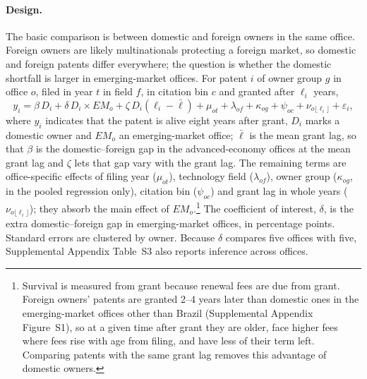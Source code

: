 \paragraph{Design.} The basic comparison is between domestic and foreign owners in the same office. Foreign owners are likely multinationals protecting a foreign market, so domestic
and foreign patents differ everywhere; the question is whether the domestic shortfall is larger in emerging-market
offices. For patent $i$ of owner group $g$ in office $o$, filed in year $t$ in field $f$, in citation bin $c$ and granted
after $\ell_i$ years,
\begin{equation}\label{eq:did}
  y_{i} = \beta\, D_i + \delta\, D_i \times EM_o + \zeta\, D_i (\ell_i - \bar\ell) + \mu_{ot} + \lambda_{of}
  + \kappa_{og} + \psi_{oc} + \nu_{o\lfloor\ell_i\rfloor} + \varepsilon_i ,
\end{equation}
where $y_i$ indicates that the patent is alive eight years after grant, $D_i$ marks a domestic owner and $EM_o$ an
emerging-market office; $\bar\ell$ is the mean grant lag, so that $\beta$ is the domestic--foreign gap in the
advanced-economy offices at the mean grant lag and $\zeta$ lets that gap vary with the grant lag. The remaining terms
are office-specific effects of filing year ($\mu_{ot}$), technology field ($\lambda_{of}$), owner group
($\kappa_{og}$, in the pooled regression only), citation bin ($\psi_{oc}$) and grant lag in whole years
($\nu_{o\lfloor\ell_i\rfloor}$); they absorb the main effect of $EM_o$.\footnote{Survival is measured from grant because renewal fees are due from grant. Foreign owners' patents are granted 2--4 years later than domestic ones in the emerging-market offices other than Brazil (Supplemental Appendix
Figure~S1), so at a given time after grant they are older, face higher fees where fees rise with age from filing, and
have less of their term left. Comparing patents with the same grant lag removes this advantage of domestic owners.}
The coefficient of interest, $\delta$, is the extra domestic--foreign gap in emerging-market offices, in percentage
points. Standard errors are clustered by owner. Because $\delta$ compares five offices with five, Supplemental Appendix Table~S3 also
reports inference across offices.

